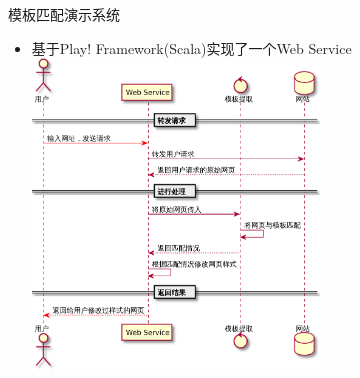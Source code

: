\begin{frame}[label=sec-2-24]{模板匹配演示系统}
\begin{itemize}
\item 基于Play! Framework(Scala)实现了一个Web Service
\includegraphics[width=0.6\textwidth]{demo}
\end{itemize}
\end{frame}

